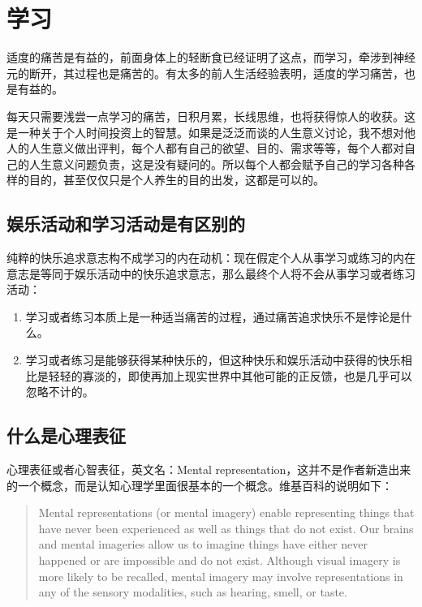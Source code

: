\documentclass[12pt,oneside]{book}
\begin{document}
\chapter{学习}
适度的痛苦是有益的，前面身体上的轻断食已经证明了这点，而学习，牵涉到神经元的断开，其过程也是痛苦的。有太多的前人生活经验表明，适度的学习痛苦，也是有益的。

每天只需要浅尝一点学习的痛苦，日积月累，长线思维，也将获得惊人的收获。这是一种关于个人时间投资上的智慧。如果是泛泛而谈的人生意义讨论，我不想对他人的人生意义做出评判，每个人都有自己的欲望、目的、需求等等，每个人都对自己的人生意义问题负责，这是没有疑问的。所以每个人都会赋予自己的学习各种各样的目的，甚至仅仅只是个人养生的目的出发，这都是可以的。


\section{娱乐活动和学习活动是有区别的}
纯粹的快乐追求意志构不成学习的内在动机：现在假定个人从事学习或练习的内在意志是等同于娱乐活动中的快乐追求意志，那么最终个人将不会从事学习或者练习活动：

\begin{enumerate}
\item 学习或者练习本质上是一种适当痛苦的过程，通过痛苦追求快乐不是悖论是什么。
\item 学习或者练习是能够获得某种快乐的，但这种快乐和娱乐活动中获得的快乐相比是轻轻的寡淡的，即使再加上现实世界中其他可能的正反馈，也是几乎可以忽略不计的。
\end{enumerate}





\section{什么是心理表征}
心理表征或者心智表征，英文名：Mental representation，这并不是作者新造出来的一个概念，而是认知心理学里面很基本的一个概念。维基百科的说明如下：

\begin{quote}
Mental representations (or mental imagery) enable representing things that have never been experienced as well as things that do not exist. Our brains and mental imageries allow us to imagine things have either never happened or are impossible and do not exist. Although visual imagery is more likely to be recalled, mental imagery may involve representations in any of the sensory modalities, such as hearing, smell, or taste. 
\end{quote}
\end{document}
